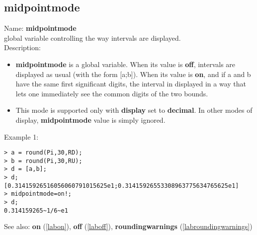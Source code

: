 \subsection{midpointmode}
\label{labmidpointmode}
\noindent Name: \textbf{midpointmode}\\
global variable controlling the way intervals are displayed.\\

\noindent Description: \begin{itemize}

\item \textbf{midpointmode} is a global variable. When its value is \textbf{off}, intervals are displayed
   as usual (with the form [a;b]).
   When its value is \textbf{on}, and if a and b have the same first significant digits,
   the interval in displayed in a way that lets one immediately see the common
   digits of the two bounds.

\item This mode is supported only with \textbf{display} set to \textbf{decimal}. In other modes of 
   display, \textbf{midpointmode} value is simply ignored.
\end{itemize}
\noindent Example 1: 
\begin{center}\begin{minipage}{15cm}\begin{Verbatim}[frame=single]
> a = round(Pi,30,RD);
> b = round(Pi,30,RU);
> d = [a,b];
> d;
[0.31415926516056060791015625e1;0.31415926553308963775634765625e1]
> midpointmode=on!;
> d;
0.314159265~1/6~e1
\end{Verbatim}
\end{minipage}\end{center}
See also: \textbf{on} (\ref{labon}), \textbf{off} (\ref{laboff}), \textbf{roundingwarnings} (\ref{labroundingwarnings})

